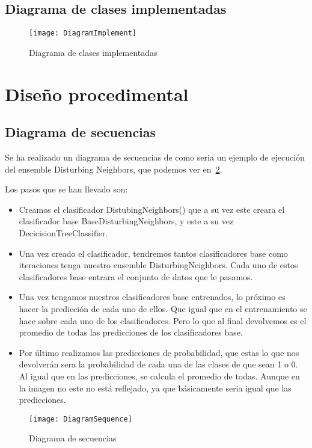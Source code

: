 \subsection{Diagrama de clases implementadas}\label{diagram-implement}
\begin{figure}
\centering
\texttt{[image: DiagramImplement]}
\caption{Diagrama de clases implementadas}
\label{fig:DiagramImplement}
\end{figure}

\section{Diseño procedimental}
\subsection{Diagrama de secuencias}\label{diagrama-secuencias}
Se ha realizado un diagrama de secuencias de como seria un ejemplo de ejecución del ensemble Disturbing Neighbors, que podemos ver en~\ref{fig:DiagramSequence}.

Los pasos que se han llevado son:
\begin{itemize}
	\item Creamos el clasificador DistubingNeighbors() que a su vez este creara el clasificador base BaseDisturbingNeighbors, y este a su vez DecicisionTreeClassifier.
	\item Una vez creado el clasificador, tendremos tantos clasificadores base como iteraciones tenga nuestro ensemble DisturbingNeighbors. Cada uno de estos clasificadores base entrara el conjunto de datos que le pasamos.
	\item Una vez tengamos nuestros clasificadores base entrenados, lo próximo es hacer la predicción de cada uno de ellos. Que igual que en el entrenamiento se hace sobre cada uno de los clasificadores. Pero lo que al final devolvemos es el promedio de todas las predicciones de los clasificadores base.
	\item Por último realizamos las predicciones de probabilidad, que estas lo que nos devolverán sera la probabilidad de cada una de las clases de que sean 1 o 0. Al igual que en las predicciones, se calcula el promedio de todas. Aunque en la imagen no este no está reflejado, ya que básicamente seria igual que las predicciones. 
\end{itemize}
\begin{figure}
\centering
\texttt{[image: DiagramSequence]}
\caption{Diagrama de secuencias}
\label{fig:DiagramSequence}
\end{figure}

